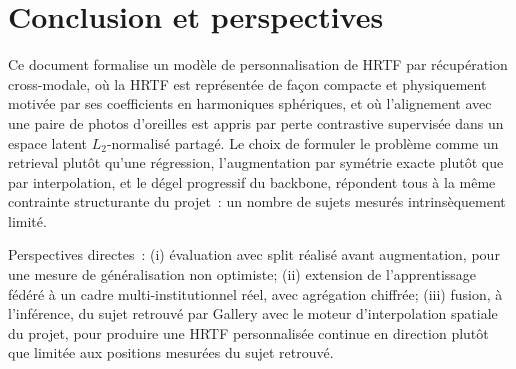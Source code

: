 \documentclass[12pt, a4paper]{article}
\begin{document}
\section{Conclusion et perspectives}

Ce document formalise un modèle de personnalisation de HRTF par
récupération cross-modale, où la HRTF est représentée de façon compacte et
physiquement motivée par ses coefficients en harmoniques sphériques, et où
l'alignement avec une paire de photos d'oreilles est appris par perte
contrastive supervisée dans un espace latent $L_2$-normalisé partagé. Le
choix de formuler le problème comme un retrieval plutôt qu'une régression,
l'augmentation par symétrie exacte plutôt que par interpolation, et le
dégel progressif du backbone, répondent tous à la même contrainte
structurante du projet~: un nombre de sujets mesurés intrinsèquement
limité.

Perspectives directes~: (i) évaluation avec split réalisé avant
augmentation, pour une mesure de généralisation non optimiste; (ii)
extension de l'apprentissage fédéré à un cadre multi-institutionnel réel,
avec agrégation chiffrée; (iii) fusion, à l'inférence, du sujet retrouvé
par Gallery avec le moteur d'interpolation spatiale du projet, pour
produire une HRTF personnalisée continue en direction plutôt que limitée
aux positions mesurées du sujet retrouvé.
\end{document}
